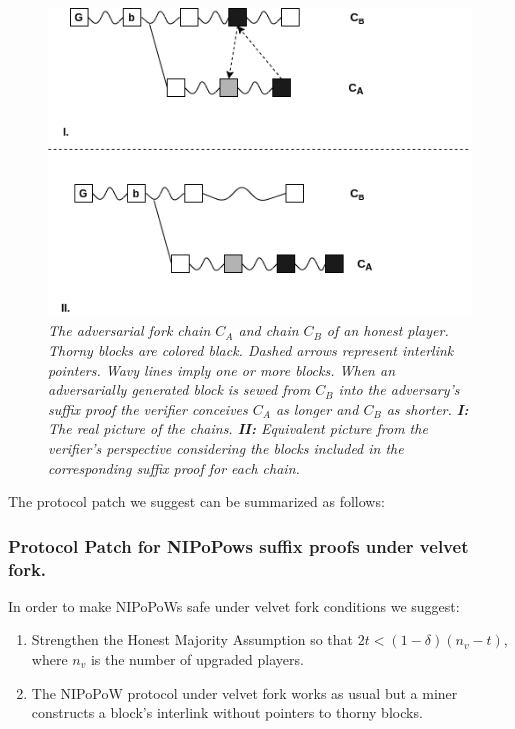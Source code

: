 \begin{figure}[h!]
	\begin{center}
		\includegraphics[scale=0.5]{figures/injection.png}
	\end{center}
	\caption{\textit{The adversarial fork chain $C_A$ and chain $C_B$ of an honest
	player. Thorny blocks are colored black. Dashed arrows represent interlink
	pointers. Wavy lines imply one or more blocks. When an adversarially generated
	block is sewed from $C_B$ into the adversary's suffix proof the verifier
	conceives $C_A$ as longer and $C_B$ as shorter.  \textbf{I:} The real picture
	of the chains. \textbf{II:} Equivalent picture from the verifier's perspective
	considering the blocks included in the corresponding suffix proof for each chain.}}
	\label{fig:injection}
\end{figure}


The protocol patch we suggest can be summarized as follows:\\


\subsubsection*{Protocol Patch for NIPoPows suffix proofs under velvet fork.} In order
to make NIPoPoWs safe under velvet fork conditions we suggest:
\begin{enumerate}
\item Strengthen the Honest Majority Assumption so that $2t < (1 - \delta)(n_v-t)$,
where $n_v$ is the number of upgraded players.
\item The NIPoPoW protocol under velvet fork works as usual but a miner constructs
a block's interlink without pointers to thorny blocks.
\end{enumerate}


